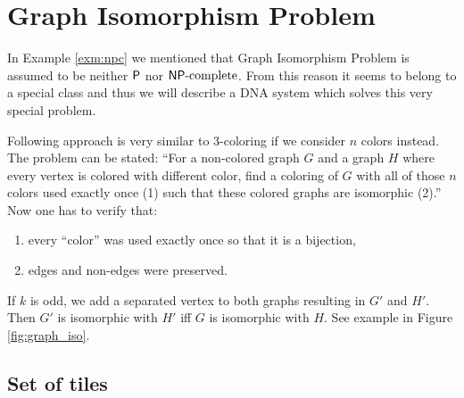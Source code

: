\section{Graph Isomorphism Problem}

In Example \ref{exm:npc} we mentioned that Graph Isomorphism Problem is assumed to be neither $\P$ nor $\NPC$. From this reason it seems to belong to a special class and thus we will describe a DNA system which solves this very special problem. %

Following approach is very similar to 3-coloring if we consider $n$ colors instead. The problem can be stated: ``For a non-colored graph $G$ and a graph $H$ where every vertex is colored with different color, find a coloring of $G$ with all of those $n$ colors used exactly once (1) such that these colored graphs are isomorphic (2).'' Now one has to verify that:
\begin{enumerate}
	\item every ``color'' was used exactly once so that it is a bijection,
	\item edges and non-edges were preserved.
\end{enumerate}

If $k$ is odd, we add a separated vertex to both graphs resulting in $G'$ and $H'$. Then $G'$ is isomorphic with $H'$ iff $G$ is isomorphic with $H$. See example in Figure \ref{fig:graph_iso}.

\subsection*{Set of tiles}

